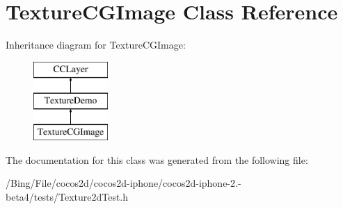 \hypertarget{interface_texture_c_g_image}{\section{Texture\-C\-G\-Image Class Reference}
\label{interface_texture_c_g_image}
}
Inheritance diagram for Texture\-C\-G\-Image\-:\begin{figure}[H]
\begin{center}
\leavevmode
\includegraphics[height=3.000000cm]{interface_texture_c_g_image}
\end{center}
\end{figure}


The documentation for this class was generated from the following file\-:\begin{DoxyCompactItemize}
\item 
/\-Bing/\-File/cocos2d/cocos2d-\/iphone/cocos2d-\/iphone-\/2.-\/beta4/tests/Texture2d\-Test.\-h\end{DoxyCompactItemize}

